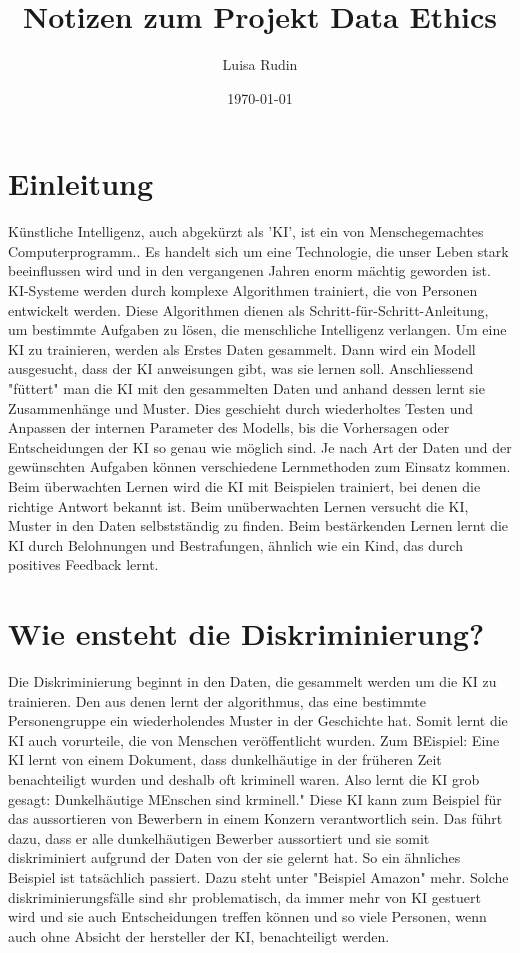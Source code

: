 \documentclass{article}
\title{Notizen zum Projekt Data Ethics}
\author{Luisa Rudin}
\date{\today}
\begin{document}
\maketitle


\tableofcontents

\section{Einleitung}
Künstliche Intelligenz, auch abgekürzt als 'KI', ist ein von Menschegemachtes Computerprogramm.. Es handelt sich um eine Technologie, die unser Leben stark beeinflussen wird und in den vergangenen Jahren enorm mächtig geworden ist. KI-Systeme werden durch komplexe Algorithmen trainiert, die von Personen entwickelt werden. Diese Algorithmen dienen als Schritt-für-Schritt-Anleitung, um bestimmte Aufgaben zu lösen, die menschliche Intelligenz verlangen.  Um eine KI zu trainieren, werden als Erstes Daten gesammelt. Dann wird ein Modell ausgesucht, dass der KI anweisungen gibt, was sie lernen soll. Anschliessend "füttert" man die KI mit den gesammelten Daten und anhand dessen lernt sie Zusammenhänge und Muster. Dies geschieht durch wiederholtes Testen und Anpassen der internen Parameter des Modells, bis die Vorhersagen oder Entscheidungen der KI so genau wie möglich sind. Je nach Art der Daten und der gewünschten Aufgaben können verschiedene Lernmethoden zum Einsatz kommen. Beim überwachten Lernen wird die KI mit Beispielen trainiert, bei denen die richtige Antwort bekannt ist. Beim unüberwachten Lernen versucht die KI, Muster in den Daten selbstständig zu finden. Beim bestärkenden Lernen lernt die KI durch Belohnungen und Bestrafungen, ähnlich wie ein Kind, das durch positives Feedback lernt.



\section{Wie ensteht die Diskriminierung?}
Die Diskriminierung beginnt in den Daten, die gesammelt werden um die KI zu trainieren. Den aus denen lernt der algorithmus, das eine bestimmte Personengruppe ein wiederholendes Muster in der Geschichte hat. Somit lernt die KI auch vorurteile, die von Menschen veröffentlicht wurden. Zum BEispiel: Eine KI lernt von einem Dokument, dass dunkelhäutige in der früheren Zeit benachteiligt wurden und deshalb oft kriminell waren. Also lernt die KI grob gesagt: Dunkelhäutige MEnschen sind krminell." Diese KI kann zum Beispiel für das aussortieren von Bewerbern in einem Konzern verantwortlich sein. Das führt dazu, dass er alle dunkelhäutigen Bewerber aussortiert und sie somit diskriminiert aufgrund der Daten von der sie gelernt hat. So ein ähnliches Beispiel ist tatsächlich passiert. Dazu steht unter "Beispiel Amazon" mehr. Solche diskriminierungsfälle sind shr problematisch, da immer mehr von KI gestuert wird und sie auch Entscheidungen treffen können und so viele Personen, wenn auch ohne Absicht der hersteller der KI, benachteiligt werden. 
\end{document}
